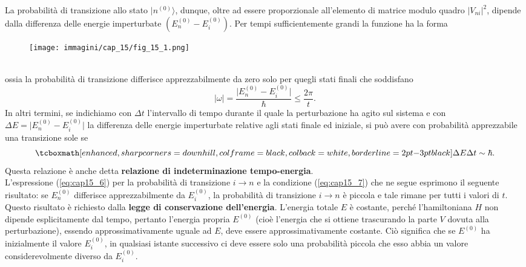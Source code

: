 La probabilità di transizione allo stato $\vert n ^{(0)} \rangle$, dunque, oltre ad essere proporzionale all'elemento di matrice modulo quadro $\vert V_{ni}\vert ^2$, dipende dalla differenza delle energie imperturbate $(E_n ^{(0)} - E_i ^{(0)}) $. Per tempi sufficientemente grandi la funzione ha la forma
\begin{figure}[!htbp]
\begin{center}
\texttt{[image: immagini/cap\_15/fig\_15\_1.png]}
\end{center}
\end{figure}\\
ossia la probabilità di transizione differisce apprezzabilmente da zero solo per quegli stati finali che soddisfano
\begin{equation}
\vert \omega \vert = \frac{\vert E_n ^{(0)} - E_i ^{(0)}\vert}{\hbar} \leq \frac{2\pi}{t}.
\end{equation}
In altri termini, se indichiamo con $\Delta t$ l'intervallo di tempo durante il quale la perturbazione ha agito sul sistema e con $\Delta E = \vert E_n ^{(0)} - E_i ^{(0)}\vert$ la differenza delle energie imperturbate relative agli stati finale ed iniziale, si può avere con probabilità apprezzabile una transizione sole se
	\begin{equation}
		\tcboxmath[enhanced, sharp corners=downhill, colframe=black, colback=white, borderline={2pt}{-3pt}{black}]{
			\Delta E \Delta t \sim \hbar .
			}
	\label{eq:cap15_7}
	\end{equation}
Questa relazione è anche detta \textbf{relazione di indeterminazione tempo-energia}.\\

L'espressione (\ref{eq:cap15_6}) per la probabilità di transizione $i\rightarrow n$ e la condizione (\ref{eq:cap15_7}) che ne segue esprimono il seguente risultato: se $E_n ^{(0)}$ differisce apprezzabilmente da   $E_i ^{(0)}$, la probabilità di transizione $i \rightarrow n$ è piccola e tale rimane per tutti i valori di $t$. Questo risultato è richiesto dalla  \textbf{legge di conservazione dell'energia}. L'energia totale $E$ è costante, perché l'hamiltoniana $H$ non dipende esplicitamente dal tempo, pertanto l'energia propria $E^{(0)}$ (cioè l'energia che si ottiene trascurando la parte $V$ dovuta alla perturbazione), essendo approssimativamente uguale ad $E$, deve essere approssimativamente costante. Ciò significa che se $E^{(0)}$ ha inizialmente il valore $E _i ^{(0)}$, in qualsiasi istante successivo ci deve essere solo una probabilità piccola che esso abbia un valore considerevolmente diverso da $E _i ^{(0)}$.\\


